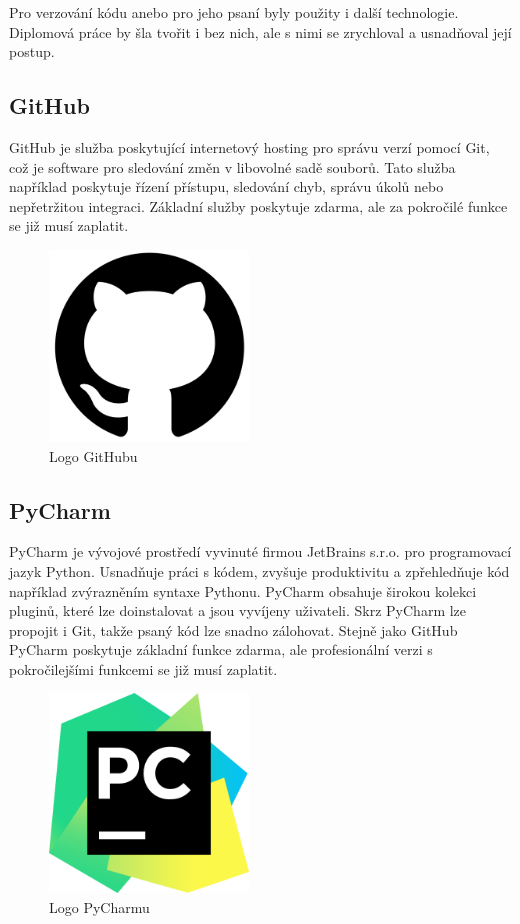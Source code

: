 Pro verzování kódu anebo pro jeho psaní byly použity i další technologie. Diplomová práce by šla tvořit i bez nich,
ale s nimi se zrychloval a usnadňoval její postup.

\subsection{GitHub}
\label{section-github}

GitHub je služba poskytující internetový hosting pro správu verzí pomocí Git, což je software pro sledování 
změn v libovolné sadě souborů. Tato služba například poskytuje řízení přístupu, sledování chyb, 
správu úkolů nebo nepřetržitou integraci. Základní služby poskytuje zdarma, ale za pokročilé funkce se již musí zaplatit.

\begin{figure}[H] \centering
    \includegraphics[width=150pt]{./pictures/github.png}
    \caption[Logo GitHubu]{Logo GitHubu \cite{github}}
	\label{fig:github}                                
\end{figure} 

\subsection{PyCharm}

PyCharm je vývojové prostředí vyvinuté firmou JetBrains s.r.o. pro programovací jazyk Python.
Usnadňuje práci s kódem, zvyšuje produktivitu a zpřehledňuje kód například zvýrazněním syntaxe Pythonu.
PyCharm obsahuje širokou kolekci plu\-ginů, které lze doinstalovat a jsou vyvíjeny uživateli.
Skrz PyCharm lze propojit i Git, takže psaný kód lze snadno zálohovat. Stejně jako GitHub PyCharm poskytuje 
základní funkce zdarma, ale profesionální verzi s pokročilejšími funkcemi se již musí zaplatit.

\begin{figure}[H] \centering
    \includegraphics[width=150pt]{./pictures/pycharm.png}
    \caption[Logo PyCharmu]{Logo PyCharmu \cite{pycharm}}
	\label{fig:pycharm}                                
\end{figure} 
 